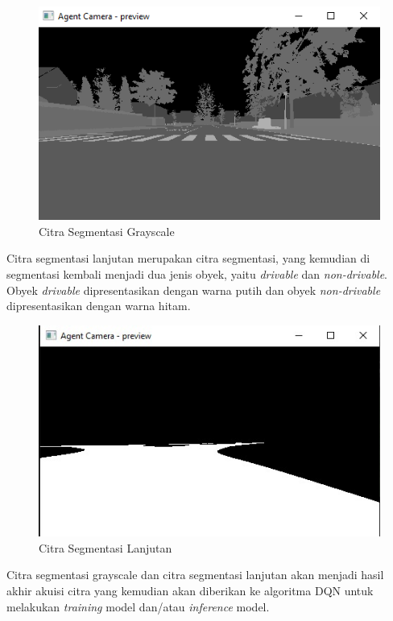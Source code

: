 \documentclass[conference]{IEEEtran}
\begin{document}
\begin{figure}[H] 
	\centering
	\includegraphics[width=1\linewidth]{images/grayscale}
	\caption{Citra Segmentasi Grayscale}
	\label{fig:grayscale}
\end{figure}

Citra segmentasi lanjutan merupakan citra segmentasi, yang kemudian di segmentasi kembali menjadi dua jenis obyek, yaitu \textit{drivable }dan \textit{non-drivable}. Obyek \textit{drivable} dipresentasikan dengan warna putih dan obyek \textit{non-drivable} dipresentasikan dengan warna hitam.

\begin{figure}[H] 
	\centering
	\includegraphics[width=1\linewidth]{images/segmentasi_hitam_putih}
	\caption{Citra Segmentasi Lanjutan}
	\label{fig:segmentasi_hitam_putih}
\end{figure}

Citra segmentasi grayscale dan citra segmentasi lanjutan akan menjadi hasil akhir akuisi citra yang kemudian akan diberikan ke algoritma DQN untuk melakukan \textit{training} model dan/atau \textit{inference} model.
\end{document}
